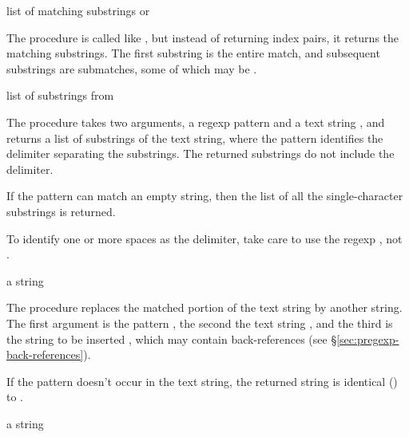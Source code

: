 \begin{procedure}
\end{procedure}
\returns{} list of matching substrings or 

The  procedure is called like
, but instead of returning index pairs,
it returns the matching substrings. The first substring is the entire
match, and subsequent substrings are submatches, some of which may be
.

\begin{procedure}
\end{procedure}
\returns{} list of substrings from 

The  procedure takes two arguments, a regexp
pattern  and a text string , and returns a list of
substrings of the text string, where the pattern identifies the
delimiter separating the substrings. The returned substrings do not
include the delimiter.

If the pattern can match an empty string, then the list of all the
single-character substrings is returned.

To identify one or more spaces as the delimiter, take care to use the
regexp , not .

\begin{procedure}
\end{procedure}
\returns{} a string

The  procedure replaces the matched portion of
the text string by another string.  The first argument is the pattern
, the second the text string , and the third is the
string to be inserted , which may contain back-references
(see \S\ref{sec:pregexp-back-references}).

If the pattern doesn't occur in the text string, the returned string
is identical () to .

\begin{procedure}
\end{procedure}
\returns{} a string

